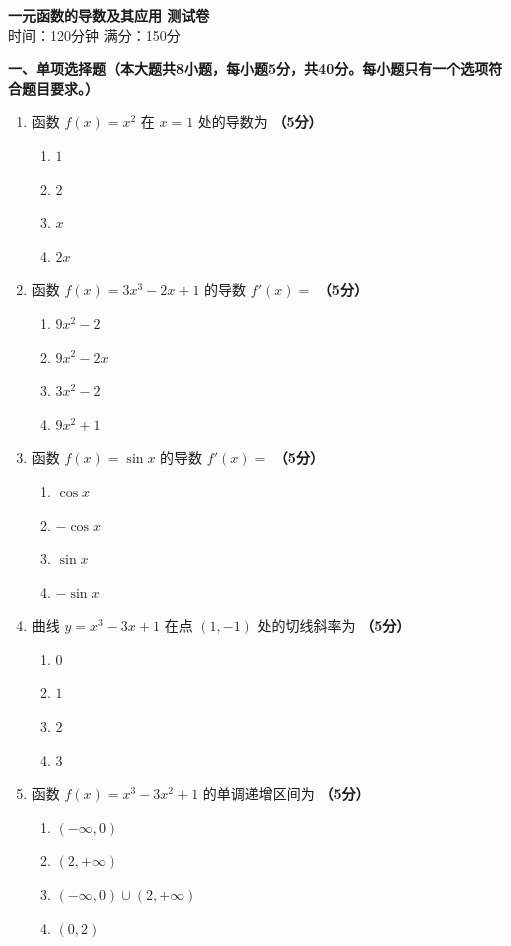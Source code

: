 \documentclass[12pt, a4paper]{ctexart}
\newcommand{\score}[1]{\hfill\textbf{（#1分）}}
\begin{document}
\begin{center}
{\Large\bfseries 一元函数的导数及其应用 测试卷}\\[0.5em]
{\normalsize 时间：120分钟 \quad 满分：150分}
\end{center}

\vspace{1em}

\noindent\textbf{一、单项选择题（本大题共8小题，每小题5分，共40分。每小题只有一个选项符合题目要求。）}

\vspace{0.5em}

\begin{enumerate}
\item 函数 $f(x)=x^2$ 在 $x=1$ 处的导数为 \score{5}
\begin{enumerate}[label=\Alph*.]
\item $1$
\item $2$
\item $x$
\item $2x$
\end{enumerate}

\item 函数 $f(x)=3x^3-2x+1$ 的导数 $f'(x)=$ \score{5}
\begin{enumerate}[label=\Alph*.]
\item $9x^2-2$
\item $9x^2-2x$
\item $3x^2-2$
\item $9x^2+1$
\end{enumerate}

\item 函数 $f(x)=\sin x$ 的导数 $f'(x)=$ \score{5}
\begin{enumerate}[label=\Alph*.]
\item $\cos x$
\item $-\cos x$
\item $\sin x$
\item $-\sin x$
\end{enumerate}

\item 曲线 $y=x^3-3x+1$ 在点 $(1,-1)$ 处的切线斜率为 \score{5}
\begin{enumerate}[label=\Alph*.]
\item $0$
\item $1$
\item $2$
\item $3$
\end{enumerate}

\item 函数 $f(x)=x^3-3x^2+1$ 的单调递增区间为 \score{5}
\begin{enumerate}[label=\Alph*.]
\item $(-\infty,0)$
\item $(2,+\infty)$
\item $(-\infty,0)\cup(2,+\infty)$
\item $(0,2)$
\end{enumerate}


\end{enumerate}
\end{document}
